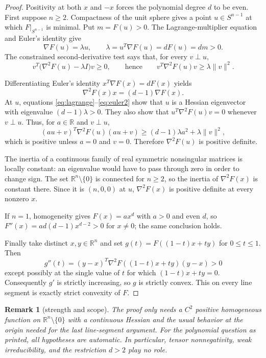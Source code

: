 \documentclass[11pt]{article}
\newtheorem{remark}{Remark}
\newcommand{\R}{\mathbb R}
\begin{document}
\begin{proof}
Positivity at both $x$ and $-x$ forces the polynomial degree $d$ to be even.
First suppose $n\ge2$. Compactness of the unit sphere gives a point
$u\in S^{n-1}$ at which $F|_{S^{n-1}}$ is minimal. Put
$m=F(u)>0$. The Lagrange-multiplier equation and Euler's identity give
\begin{equation}\label{eq:lagrange}
 \nabla F(u)=\lambda u,
 \qquad
 \lambda=u^{T}\nabla F(u)=dF(u)=dm>0.
\end{equation}
The constrained second-derivative test says that, for every $v\perp u$,
\begin{equation}\label{eq:tangent}
 v^T\bigl(\nabla^2F(u)-\lambda I\bigr)v\ge0,
 \qquad\text{hence}\qquad
 v^T\nabla^2F(u)v\ge\lambda\lVert v\rVert^2.
\end{equation}

Differentiating Euler's identity $x^T\nabla F(x)=dF(x)$ yields
\begin{equation}\label{eq:euler2}
 \nabla^2F(x)x=(d-1)\nabla F(x).
\end{equation}
At $u$, equations \eqref{eq:lagrange}--\eqref{eq:euler2} show that $u$ is a
Hessian eigenvector with eigenvalue $(d-1)\lambda>0$. They also show that
$u^T\nabla^2F(u)v=0$ whenever $v\perp u$. Thus, for $a\in\R$ and
$v\perp u$,
\[
 (au+v)^T\nabla^2F(u)(au+v)
 \ge (d-1)\lambda a^2+\lambda\lVert v\rVert^2,
\]
which is positive unless $a=0$ and $v=0$. Therefore $\nabla^2F(u)$ is
positive definite.

The inertia of a continuous family of real symmetric nonsingular matrices is
locally constant: an eigenvalue would have to pass through zero in order to
change sign. The set $\R^n\setminus\{0\}$ is connected for $n\ge2$, so the
inertia of $\nabla^2F(x)$ is constant there. Since it is $(n,0,0)$ at $u$,
$\nabla^2F(x)$ is positive definite at every nonzero $x$.

If $n=1$, homogeneity gives $F(x)=a x^d$ with $a>0$ and even $d$, so
$F''(x)=ad(d-1)x^{d-2}>0$ for $x\ne0$; the same conclusion holds.

Finally take distinct $x,y\in\R^n$ and set
$g(t)=F((1-t)x+ty)$ for $0\le t\le1$. Then
\[
 g''(t)=(y-x)^T\nabla^2F((1-t)x+ty)(y-x)>0
\]
except possibly at the single value of $t$ for which $(1-t)x+ty=0$.
Consequently $g'$ is strictly increasing, so $g$ is strictly convex. This on
every line segment is exactly strict convexity of $F$.
\end{proof}

\begin{remark}[strength and scope]
The proof only needs a $C^2$ positive homogeneous function on
$\R^n\setminus\{0\}$ with a continuous Hessian and the usual behavior at the
origin needed for the last line-segment argument. For the polynomial question
as printed, all hypotheses are automatic. In particular, tensor
nonnegativity, weak irreducibility, and the restriction $d>2$ play no role.
\end{remark}
\end{document}

